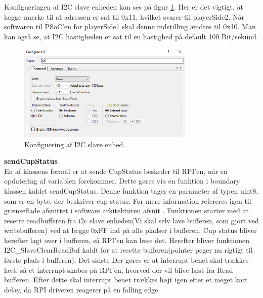 \documentclass[Softwaredesign/Softwaredesign_main.tex]{subfiles}
\begin{document}
Konfigueringen af I2C slave enheden kan ses på figur \ref{fig:i2c_settings}. Her er det vigtigt, at lægge mærke til at adressen er sat til 0x11, hvilket svarer til playerSide2. Når softwaren til PSoC'en for playerSide1 skal denne indstilling ændres til 0x10. Man kan også se, at I2C hastigheden er sat til en hastighed på default 100 Bit/sekund. 
\begin{figure}[H]
    \centering
    \includegraphics[width=0.75\textwidth]{Softwaredesign/RPI_IF/graphics/i2c_settings.PNG}
    \caption{Konfiguering af I2C slave enhed.}
    \label{fig:i2c_settings}
\end{figure}

\textbf{sendCupStatus}\\
En af klassens formål er at sende CupStatus beskeder til RPI'en, når en opdatering af variablen forekommer. Dette gøres  via en funktion i boundary klassen kaldet sendCupStatus. Denne funktion tager en parameter af typen uint8, som er en byte, der beskriver cup status. For mere information refereres igen til grænseflade afsnittet i software arkitekturen afsnit . Funktionen starter med at resette readbufferen fra i2c slave enheden(Vi skal selv lave bufferen, som gjort ved writebufferen) ved at lægge 0xFF ind på alle pladser i bufferen. Cup status bliver herefter lagt over i bufferen, så RPI'en kan læse det. Herefter bliver funktionen I2C\_SlaveClearReadBuf kaldt for at resette bufferen(pointer peger nu rigtigt til første plads i bufferen). Det sidste Der gøres er at interrupt benet skal trækkes lavt, så et interrupt skabes på RPI'en, hvorved der vil blive læst fra Read bufferen.  Efter dette skal interrupt benet trækkes højt igen efter et meget kort delay, da RPI driveren reagerer på en falling edge.
\end{document}

